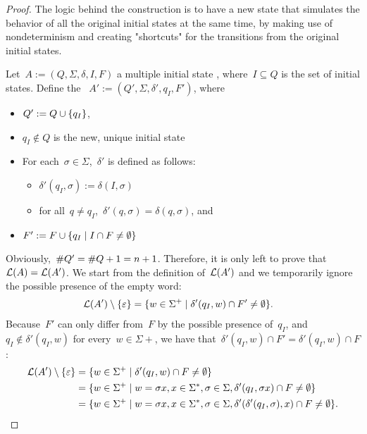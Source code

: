 \begin{proof}
	The logic behind the construction is to have a new state that simulates the behavior of all the original initial states at the same time, by making use of nondeterminism and creating "shortcuts" for the transitions from the original initial states.

	Let~$A:=(Q,\Sigma,\delta,I,F)$ a multiple initial state \ONFA, where~$I\subseteq Q$ is the set of initial states.
	Define the \ONFA~$A':=(Q',\Sigma,\delta',q_I,F')$, where
	\begin{itemize}
		\item $Q':=Q\cup\{q_I\}$,
		\item $q_I\notin Q$ is the new, unique initial state
		\item For each~$\sigma\in\Sigma$,~$\delta'$ is defined as follows:
		      \begin{itemize}
			      \item $\delta'(q_I,\sigma):=\delta(I,\sigma)$
			      \item for all~$q\ne q_I$,~$\delta'(q,\sigma)=\delta(q,\sigma)$, and
		      \end{itemize}
		\item $F':=F\cup\{q_I\mid I\cap F\ne\emptyset\}$
	\end{itemize}
	Obviously,~$\# Q'=\# Q+1=n+1$. Therefore, it is only left to prove that~$\mathcal L(A)=\mathcal L(A')$.
	We start from the definition of~$\mathcal L(A')$ and we temporarily ignore the possible presence of the empty word:
	\begin{align*}
		\mathcal L(A')\setminus\{\varepsilon\} & = \{w\in\Sigma^+\mid \delta'(q_I,w)\cap F'\ne\emptyset\} \text.
	\end{align*}
	Because~$F'$ can only differ from~$F$ by the possible presence of~$q_I$, and~$q_I\notin\delta'(q_I,w)$ for every~$w\in\Sigma\plus$, we have that~$\delta'(q_I,w)\cap F'=\delta'(q_I,w)\cap F$:
	\begin{align*}
		\genlang(A')\setminus\set{\emptyword} & = \set{w\in\Sigma\plus\mid \delta'(q_I,w)\cap F\ne\emptyset}                                                                    \\
		                                      & = \set{w\in\Sigma\plus\mid w=\sigma x, x\in\Sigma\star,\sigma\in\Sigma,\delta'(q_I,\sigma x)\cap F\ne\emptyset}                 \\
		                                      & = \set{w\in\Sigma\plus\mid w=\sigma x, x\in\Sigma\star,\sigma\in\Sigma,\delta'(\delta'(q_I,\sigma),x)\cap F\ne\emptyset} \text.

\end{align*}
\end{proof}
